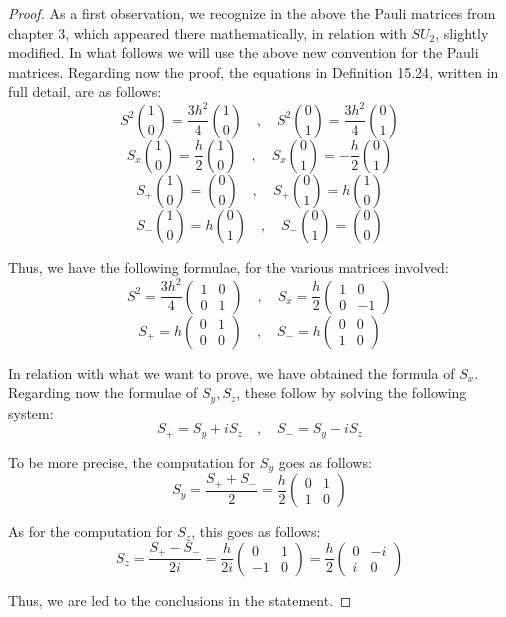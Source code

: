 \documentclass[12pt]{amsbook}
\begin{document}
\begin{proof}
As a first observation, we recognize in the above the Pauli matrices from chapter 3, which appeared there mathematically, in relation with $SU_2$, slightly modified. In what follows we will use the above new convention for the Pauli matrices. Regarding now the proof, the equations in Definition 15.24, written in full detail, are as follows:
$$S^2\binom{1}{0}=\frac{3h^2}{4}\binom{1}{0}
\quad,\quad
S^2\binom{0}{1}=\frac{3h^2}{4}\binom{0}{1}$$
$$S_x\binom{1}{0}=\frac{h}{2}\binom{1}{0}
\quad,\quad
S_x\binom{0}{1}=-\frac{h}{2}\binom{0}{1}$$
$$S_+\binom{1}{0}=\binom{0}{0}\quad,\quad S_+\binom{0}{1}=h\binom{1}{0}$$
$$S_-\binom{1}{0}=h\binom{0}{1}\quad,\quad S_-\binom{0}{1}=\binom{0}{0}$$

Thus, we have the following formulae, for the various matrices involved:
$$S^2=\frac{3h^2}{4}\begin{pmatrix}1&0\\0&1\end{pmatrix}
\quad,\quad S_x=\frac{h}{2}\begin{pmatrix}1&0\\0&-1\end{pmatrix}$$
$$S_+=h\begin{pmatrix}0&1\\0&0\end{pmatrix}
\quad,\quad S_-=h\begin{pmatrix}0&0\\1&0\end{pmatrix}$$

In relation with what we want to prove, we have obtained the formula of $S_x$. Regarding now the formulae of $S_y,S_z$, these follow by solving the following system:
$$S_+=S_y+iS_z\quad,\quad 
S_-=S_y-iS_z$$

To be more precise, the computation for $S_y$ goes as follows:
$$S_y=\frac{S_++S_-}{2}=\frac{h}{2}\begin{pmatrix}0&1\\1&0\end{pmatrix}$$

As for the computation for $S_z$, this goes as follows:
$$S_z=\frac{S_+-S_-}{2i}=\frac{h}{2i}\begin{pmatrix}0&1\\-1&0\end{pmatrix}=
\frac{h}{2}\begin{pmatrix}0&-i\\i&0\end{pmatrix}$$

Thus, we are led to the conclusions in the statement.
\end{proof}
\end{document}
